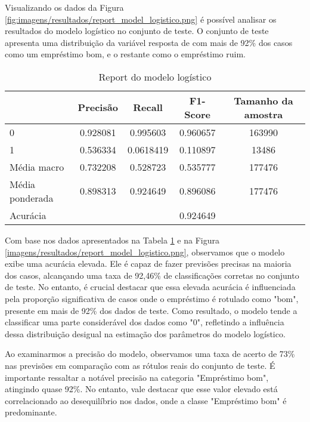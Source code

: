 
Visualizando os dados da Figura \ref{fig:imagens/resultados/report_model_logistico.png} é possível analisar 
os resultados do modelo logístico no conjunto de teste. O conjunto de teste apresenta uma distribuição da variável 
resposta de com mais de 92\% dos casos como um empréstimo bom, e o restante como o empréstimo ruim.


\begin{table}[H]
\centering
\begin{tabular}{lcccc}
  \hline
                &    \textbf{Precisão} & \textbf{Recall}    &   \textbf{F1-Score} &  \textbf{Tamanho da amostra} \\
  \hline
   0            &    0.928081 & 0.995603  &   0.960657 & 163990        \\
   1            &    0.536334 & 0.0618419 &   0.110897 & 13486        \\
   Média macro    &    0.732208 & 0.528723  &   0.535777 & 177476        \\
   Média ponderada &    0.898313 & 0.924649  &   0.896086 & 177476        \\
   \hline
   Acurácia     &             &           &   0.924649 &  \\

  \hline
\end{tabular}
\label{tab:report_logist_model}
\caption{Report do modelo logístico}
\end{table}


Com base nos dados apresentados na Tabela \ref{tab:report_logist_model}
e na Figura \ref{imagens/resultados/report_model_logistico.png},
observamos que o modelo exibe uma acurácia elevada. Ele é capaz de fazer 
previsões precisas na maioria dos casos, alcançando uma taxa de 92,46\% 
de classificações corretas no conjunto de teste. No entanto, 
é crucial destacar que essa elevada acurácia é influenciada pela proporção
significativa de casos onde o empréstimo é rotulado como "bom", presente 
em mais de 92\% dos dados de teste. Como resultado, o modelo tende a
classificar uma parte considerável dos dados como "0", refletindo a
influência dessa distribuição desigual na estimação dos parâmetros do modelo logístico. 


Ao examinarmos a precisão do modelo, observamos uma taxa de acerto de 73\%
nas previsões em comparação com as rótulos reais do conjunto de teste. 
É importante ressaltar a notável precisão na categoria "Empréstimo bom", atingindo quase 92\%. 
No entanto, vale destacar que esse valor elevado está correlacionado ao desequilíbrio nos dados,
onde a classe "Empréstimo bom" é predominante.

